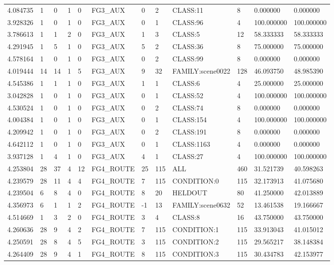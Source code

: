 \begin{tabular}{llllllllllll}
4.084735 & 1 & 0 & 1 & 0 & FG3\_AUX & 0 & 2 & CLASS:11 & 8 & 0.000000 & 0.000000 \\
3.928326 & 1 & 0 & 1 & 0 & FG3\_AUX & 0 & 1 & CLASS:96 & 4 & 100.000000 & 100.000000 \\
3.786613 & 1 & 1 & 2 & 0 & FG3\_AUX & 1 & 3 & CLASS:5 & 12 & 58.333333 & 58.333333 \\
4.291945 & 1 & 5 & 1 & 0 & FG3\_AUX & 5 & 2 & CLASS:36 & 8 & 75.000000 & 75.000000 \\
4.578164 & 1 & 0 & 1 & 0 & FG3\_AUX & 0 & 2 & CLASS:99 & 8 & 0.000000 & 0.000000 \\
4.019444 & 14 & 14 & 1 & 5 & FG3\_AUX & 9 & 32 & FAMILY:scene0022 & 128 & 46.093750 & 48.985390 \\
4.545386 & 1 & 1 & 1 & 0 & FG3\_AUX & 1 & 1 & CLASS:6 & 4 & 25.000000 & 25.000000 \\
3.042828 & 1 & 0 & 1 & 0 & FG3\_AUX & 0 & 1 & CLASS:52 & 4 & 100.000000 & 100.000000 \\
4.530524 & 1 & 0 & 1 & 0 & FG3\_AUX & 0 & 2 & CLASS:74 & 8 & 0.000000 & 0.000000 \\
4.004384 & 1 & 0 & 1 & 0 & FG3\_AUX & 0 & 1 & CLASS:154 & 4 & 100.000000 & 100.000000 \\
4.209942 & 1 & 0 & 1 & 0 & FG3\_AUX & 0 & 2 & CLASS:191 & 8 & 0.000000 & 0.000000 \\
4.642112 & 1 & 0 & 1 & 0 & FG3\_AUX & 0 & 1 & CLASS:1163 & 4 & 0.000000 & 0.000000 \\
3.937128 & 1 & 4 & 1 & 0 & FG3\_AUX & 4 & 1 & CLASS:27 & 4 & 100.000000 & 100.000000 \\
4.253804 & 28 & 37 & 4 & 12 & FG4\_ROUTE & 25 & 115 & ALL & 460 & 31.521739 & 40.598263 \\
4.239579 & 28 & 11 & 4 & 4 & FG4\_ROUTE & 7 & 115 & CONDITION:0 & 115 & 32.173913 & 41.075680 \\
4.239504 & 6 & 8 & 4 & 0 & FG4\_ROUTE & 8 & 20 & HELDOUT & 80 & 41.250000 & 42.013889 \\
4.356973 & 6 & 1 & 1 & 2 & FG4\_ROUTE & -1 & 13 & FAMILY:scene0632 & 52 & 13.461538 & 19.166667 \\
4.514669 & 1 & 3 & 2 & 0 & FG4\_ROUTE & 3 & 4 & CLASS:8 & 16 & 43.750000 & 43.750000 \\
4.260636 & 28 & 9 & 4 & 2 & FG4\_ROUTE & 7 & 115 & CONDITION:1 & 115 & 33.913043 & 41.015012 \\
4.250591 & 28 & 8 & 4 & 5 & FG4\_ROUTE & 3 & 115 & CONDITION:2 & 115 & 29.565217 & 38.148384 \\
4.264409 & 28 & 9 & 4 & 1 & FG4\_ROUTE & 8 & 115 & CONDITION:3 & 115 & 30.434783 & 42.153977 \\

\end{tabular}
